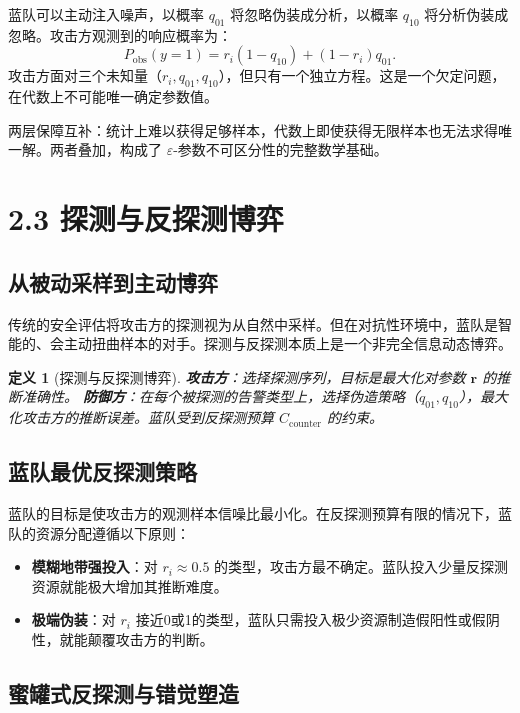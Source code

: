 \documentclass[11pt,a4paper]{article}
\newtheorem{definition}{定义}[section]
\begin{document}
蓝队可以主动注入噪声，以概率 \(q_{01}\) 将忽略伪装成分析，以概率 \(q_{10}\) 将分析伪装成忽略。攻击方观测到的响应概率为：
\[
P_{\text{obs}}(y=1) = r_i (1 - q_{10}) + (1 - r_i) q_{01}.
\]
攻击方面对三个未知量（\(r_i, q_{01}, q_{10}\)），但只有一个独立方程。这是一个欠定问题，在代数上不可能唯一确定参数值。

两层保障互补：统计上难以获得足够样本，代数上即使获得无限样本也无法求得唯一解。两者叠加，构成了 \(\varepsilon\)-参数不可区分性的完整数学基础。

\section{2.3 探测与反探测博弈}

\subsection{从被动采样到主动博弈}

传统的安全评估将攻击方的探测视为从自然中采样。但在对抗性环境中，蓝队是智能的、会主动扭曲样本的对手。探测与反探测本质上是一个非完全信息动态博弈。

\begin{definition}[探测与反探测博弈]
\textbf{攻击方}：选择探测序列，目标是最大化对参数 \(\mathbf{r}\) 的推断准确性。
\textbf{防御方}：在每个被探测的告警类型上，选择伪造策略（\(q_{01}, q_{10}\)），最大化攻击方的推断误差。蓝队受到反探测预算 \(C_{\text{counter}}\) 的约束。
\end{definition}

\subsection{蓝队最优反探测策略}

蓝队的目标是使攻击方的观测样本信噪比最小化。在反探测预算有限的情况下，蓝队的资源分配遵循以下原则：
\begin{itemize}
    \item \textbf{模糊地带强投入}：对 \(r_i \approx 0.5\) 的类型，攻击方最不确定。蓝队投入少量反探测资源就能极大增加其推断难度。
    \item \textbf{极端伪装}：对 \(r_i\) 接近0或1的类型，蓝队只需投入极少资源制造假阳性或假阴性，就能颠覆攻击方的判断。
\end{itemize}

\subsection{蜜罐式反探测与错觉塑造}
\end{document}
